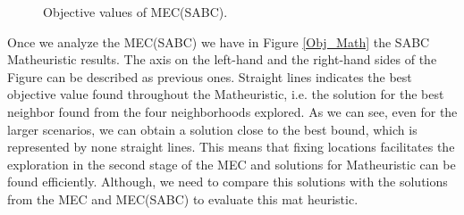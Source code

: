 \begin{figure}[H]
\hspace{0.4cm}%
\vspace{0.4cm}
\caption{Objective values of MEC(SABC).}
\label{Obj_M2M1-M1}
\end{figure}

Once we analyze the MEC(SABC) we have in Figure \ref{Obj_Math} the SABC Matheuristic results. The axis on the left-hand and the right-hand sides of the Figure can be described as previous ones. Straight lines indicates the best objective value found throughout the Matheuristic, i.e. the solution for the best neighbor found from the four neighborhoods explored. As we can see, even for the larger scenarios, we can obtain a solution close to the best bound, which is represented by none straight lines. This means that fixing locations facilitates the exploration in the second stage of the MEC and solutions for Matheuristic can be found efficiently. Although, we need to compare this solutions with the solutions from the MEC and MEC(SABC) to evaluate this mat heuristic.

